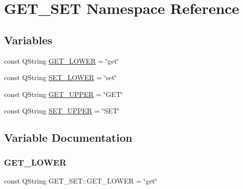 \hypertarget{namespace_g_e_t___s_e_t}{}\section{G\+E\+T\+\_\+\+S\+ET Namespace Reference}
\label{namespace_g_e_t___s_e_t}
\subsection*{Variables}
\begin{DoxyCompactItemize}
\item 
const Q\+String \hyperlink{namespace_g_e_t___s_e_t_aa602cc1b32ece3a2f6d93ce0cd7c3abf}{G\+E\+T\+\_\+\+L\+O\+W\+ER} = \char`\"{}get\char`\"{}
\item 
const Q\+String \hyperlink{namespace_g_e_t___s_e_t_aea6694af4f914e45500479b3871d90d9}{S\+E\+T\+\_\+\+L\+O\+W\+ER} = \char`\"{}set\char`\"{}
\item 
const Q\+String \hyperlink{namespace_g_e_t___s_e_t_a4334d51760ba38a9990471e935704449}{G\+E\+T\+\_\+\+U\+P\+P\+ER} = \char`\"{}G\+ET\char`\"{}
\item 
const Q\+String \hyperlink{namespace_g_e_t___s_e_t_a19007e6e8f86151fecd5c77da2f0b01b}{S\+E\+T\+\_\+\+U\+P\+P\+ER} = \char`\"{}S\+ET\char`\"{}
\end{DoxyCompactItemize}


\subsection{Variable Documentation}
\mbox{\label{namespace_g_e_t___s_e_t_aa602cc1b32ece3a2f6d93ce0cd7c3abf}} 
\subsubsection{\texorpdfstring{G\+E\+T\+\_\+\+L\+O\+W\+ER}{GET\_LOWER}}
{\footnotesize\ttfamily const Q\+String G\+E\+T\+\_\+\+S\+E\+T\+::\+G\+E\+T\+\_\+\+L\+O\+W\+ER = \char`\"{}get\char`\"{}}

\mbox{\label{namespace_g_e_t___s_e_t_a4334d51760ba38a9990471e935704449}} 
